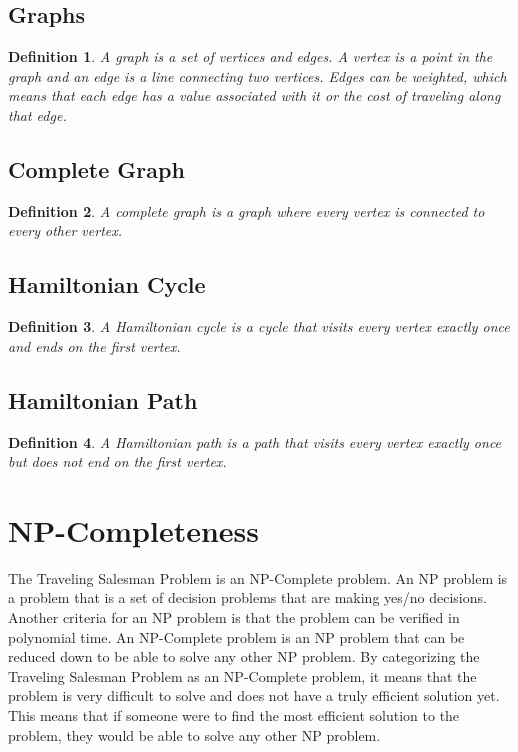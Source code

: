 \documentclass[12pt]{article}
\newtheorem{Definition}{Definition}
\begin{document}
\subsection*{Graphs}
\begin{Definition}
A graph is a set of vertices and edges. A vertex is a point in the graph and an edge is a line connecting two vertices. Edges can be weighted, which means that each edge has a value associated with it or the cost of traveling along that edge.
\end{Definition}

\subsection*{Complete Graph}
\begin{Definition}
A complete graph is a graph where every vertex is connected to every other vertex.
\end{Definition}

\subsection*{Hamiltonian Cycle}
\begin{Definition}
A Hamiltonian cycle is a cycle that visits every vertex exactly once and ends on the first vertex.
\end{Definition}

\subsection*{Hamiltonian Path}
\begin{Definition}
A Hamiltonian path is a path that visits every vertex exactly once but does not end on the first vertex.
\end{Definition}

\section{NP-Completeness}
The Traveling Salesman Problem is an NP-Complete problem. An NP problem is a problem that is a set of decision problems that are making yes/no decisions. Another criteria for an NP problem is that the problem can be verified in polynomial time. An NP-Complete problem is an NP problem that can be reduced down to be able to solve any other NP problem. By categorizing the Traveling Salesman Problem as an NP-Complete problem, it means that the problem is very difficult to solve and does not have a truly efficient solution yet. This means that if someone were to find the most efficient solution to the problem, they would be able to solve any other NP problem. 
\end{document}
